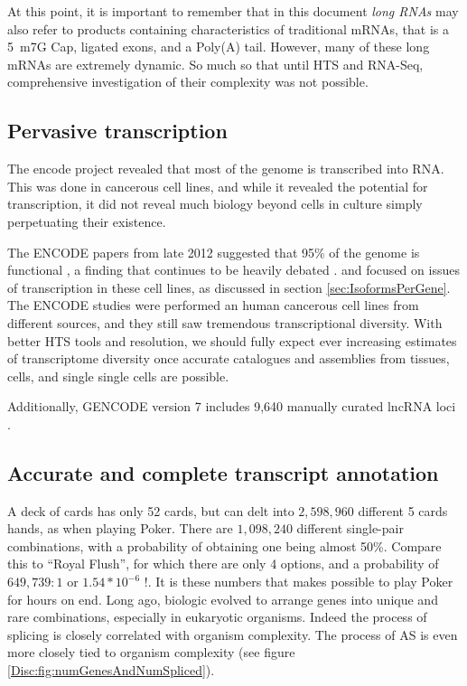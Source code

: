   At this point, it is important to remember that in this document \textit{long RNAs} may also refer to products containing characteristics of traditional mRNAs, that is a 5\textprime~m7G Cap, ligated exons, and a Poly(A) tail. However, many of these long mRNAs are extremely dynamic. So much so that until HTS and RNA-Seq, comprehensive investigation of their complexity was not possible.

  \subsection{Pervasive transcription}\label{Disc:subsec:Pervasive Tx}

    The encode project revealed that most of the genome is transcribed into RNA. This was done in cancerous cell lines, and while it revealed the potential for transcription, it did not reveal much biology beyond cells in culture simply perpetuating their existence. 

    
    The ENCODE papers from late 2012 suggested that 95\% of the genome is functional \citep{Dunham2012}, a finding that continues to be heavily debated \citep{Graur2013,Bhattacharjee2014}. \citet{Djebali2012} and focused on issues of transcription in these cell lines, as discussed in section \ref{sec:IsoformsPerGene}. The ENCODE studies were performed an human cancerous cell lines from different sources, and they still saw tremendous transcriptional diversity. With better HTS tools and resolution, we should fully expect ever increasing estimates of transcriptome diversity once accurate catalogues and assemblies from tissues, cells, and single single cells are possible.

    Additionally, GENCODE version 7 includes 9,640 manually curated lncRNA loci \citep{Derrien2012}. 

  \subsection{Accurate and complete transcript annotation}\label{Disc:subsec:Accurate and complete Tx annotation}

    A deck of cards has only 52 cards, but can delt into $2,598,960$ different 5 cards hands, as when playing Poker. There are $1,098,240$ different single-pair combinations, with a probability of obtaining one being almost 50\%. Compare this to ``Royal Flush'', for which there are only 4 options, and a probability of $649,739:1$ or $1.54 * 10^{-6}$ !. It is these numbers that makes possible to play Poker for hours on end. Long ago, biologic evolved to arrange genes into unique and rare combinations, especially in eukaryotic organisms. Indeed the process of splicing is closely correlated with organism complexity. The process of AS is even more closely tied to organism complexity (see figure \ref{Disc:fig:numGenesAndNumSpliced}).


